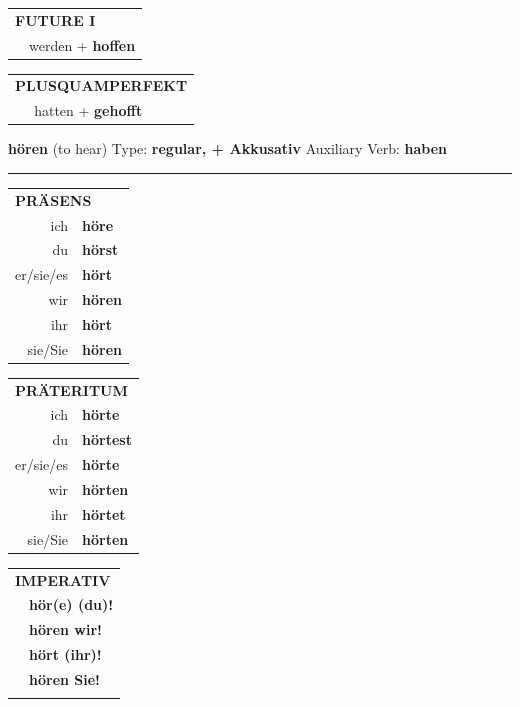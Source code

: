 \documentclass[10pt,a4paper]{revtex4-2}
\begin{document}
\begin{verbbox-acc}
\begin{tabular}{rl}
    \multicolumn{2}{l}{\textbf{FUTURE I} }\\
   & werden + \textbf{hoffen}\\
 
  \end{tabular}
\hfill
   \begin{tabular}{rl}
      \multicolumn{2}{l}{\textbf{PLUSQUAMPERFEKT}}\\
   & hatten + \textbf{gehofft}\\
  \end{tabular}
  
  \vspace{-5pt}


\end{verbbox-acc}
\begin{verbbox-acc}
    {\Large \bf hören} (to hear) \hfill Type: \textbf{regular, + Akkusativ} \hfill Auxiliary Verb: \textbf{haben} 
    
     \vspace{5pt}

    \hrule
    
    \vspace{5pt}

  \begin{tabular}{rl}
     \multicolumn{2}{l}{\textbf{PRÄSENS} }\\
    ich & \textbf{höre}\\
    du & \textbf{hörst}\\
    er/sie/es & \textbf{hört}\\
    wir & \textbf{hören}\\
    ihr & \textbf{hört}\\
    sie/Sie & \textbf{hören}\\
  \end{tabular}
  \hfill
     \begin{tabular}{rl}
    \multicolumn{2}{l}{\textbf{PRÄTERITUM} }\\
    ich & \textbf{hörte}\\
    du & \textbf{hörtest}\\
    er/sie/es & \textbf{hörte}\\
    wir & \textbf{hörten}\\
    ihr & \textbf{hörtet}\\
    sie/Sie & \textbf{hörten}\\
  \end{tabular}
  \hfill
  \begin{tabular}{rl}
     \multicolumn{2}{l}{\textbf{IMPERATIV} }\\
   & \textbf{hör(e) (du)!}\\
   & \textbf{hören wir!}\\
   & \textbf{hört (ihr)!}\\
   & \textbf{hören Sie!}\\
   & \vspace{10pt}
  \end{tabular}


\end{verbbox-acc}
\end{document}

